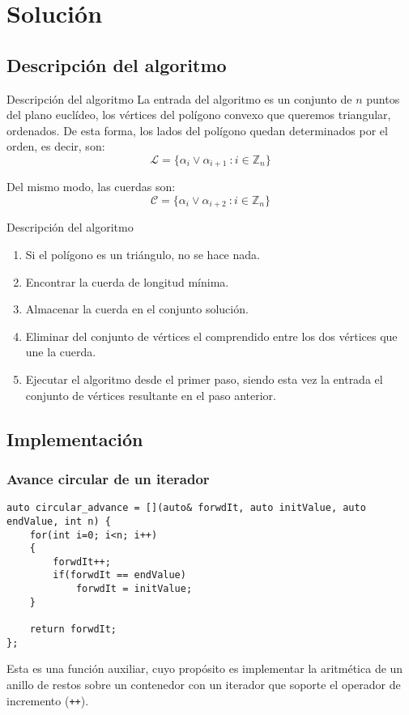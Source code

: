 \documentclass[compress]{beamer}
\begin{document}
\section{Solución}

\subsection{Descripción del algoritmo}

\begin{frame}{Descripción del algoritmo}
	La entrada del algoritmo es un conjunto de $n$ puntos del plano euclídeo, los vértices del polígono convexo que queremos triangular, ordenados. De esta forma, los lados del polígono quedan determinados por el orden, es decir, son: 
\[\mathcal{L} = \{\alpha_i \vee \alpha_{i+1}\ :  i\in \mathbb{Z}_n\}\]

Del mismo modo, las cuerdas son:
\[\mathcal{C} = \{\alpha_i \vee \alpha_{i+2}\ : i\in \mathbb{Z}_n\}\]
\end{frame}

\begin{frame}{Descripción del algoritmo}

\begin{enumerate}
    \item Si el polígono es un triángulo, no se hace nada.
	\item Encontrar la cuerda de longitud mínima.
	\item Almacenar la cuerda en el conjunto solución.
	\item Eliminar del conjunto de vértices el comprendido entre los dos vértices que une la cuerda.
	\item Ejecutar el algoritmo desde el primer paso, siendo esta vez la entrada el conjunto de vértices resultante en el paso anterior.
\end{enumerate}

\end{frame}	

\subsection{Implementación}
\begin{frame}[fragile]
	\frametitle{Avance circular de un iterador}
 \begin{lstlisting}
auto circular_advance = [](auto& forwdIt, auto initValue, auto endValue, int n) {
	for(int i=0; i<n; i++)
	{
		forwdIt++;
		if(forwdIt == endValue)
			forwdIt = initValue;
	}

	return forwdIt;
};
 \end{lstlisting}
 
Esta es una función auxiliar, cuyo propósito es implementar la aritmética de un anillo de restos sobre un contenedor con un iterador que soporte el operador de incremento (\texttt{++}).
 
\end{frame}
\end{document}
